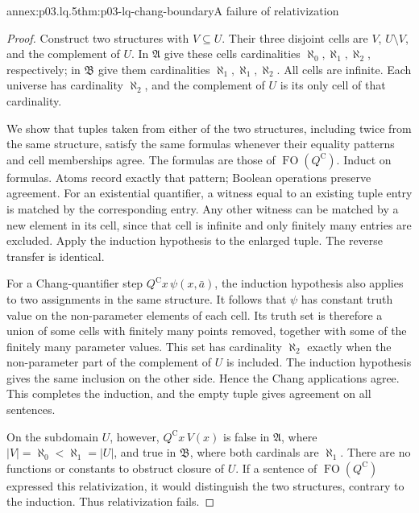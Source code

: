 \begin{annexitem}{annex:p03.lq.5}{thm:p03-lq-chang-boundary}{A failure of relativization}
\begin{proof}
Construct two structures with \(V\subseteq U\). Their three disjoint
cells are \(V\), \(U\setminus V\), and the complement of \(U\).
In \(\mathfrak A\) give these cells cardinalities
\(\aleph_0,\aleph_1,\aleph_2\), respectively; in \(\mathfrak B\)
give them cardinalities \(\aleph_1,\aleph_1,\aleph_2\).
All cells are infinite. Each universe has cardinality \(\aleph_2\),
and the complement of \(U\) is its only cell of that cardinality.

We show that tuples taken from either of the two structures, including
twice from the same structure, satisfy the same formulas whenever their
equality patterns and cell memberships agree. The formulas are those of
\(\operatorname{FO}(Q^{\mathrm C})\). Induct on formulas. Atoms
record exactly that pattern; Boolean operations preserve agreement.
For an existential quantifier, a witness equal to an existing tuple
entry is matched by the corresponding entry. Any other witness can
be matched by a new element in its cell, since that cell is infinite
and only finitely many entries are excluded. Apply the induction
hypothesis to the enlarged tuple. The reverse transfer is identical.

For a Chang-quantifier step \(Q^{\mathrm C}x\,\psi(x,\bar a)\),
the induction hypothesis also applies to two assignments in the
same structure. It follows that \(\psi\) has constant truth value
on the non-parameter elements of each cell. Its truth set is
therefore a union of some cells with finitely many points removed,
together with some of the finitely many parameter values. This
set has cardinality \(\aleph_2\) exactly when the non-parameter
part of the complement of \(U\) is included. The induction
hypothesis gives the same inclusion on the other side. Hence the
Chang applications agree. This completes the induction, and the
empty tuple gives agreement on all sentences.

On the subdomain \(U\), however, \(Q^{\mathrm C}x\,V(x)\)
is false in \(\mathfrak A\), where \(|V|=\aleph_0<\aleph_1=|U|\),
and true in \(\mathfrak B\), where both cardinals are \(\aleph_1\).
There are no functions or constants to obstruct closure of \(U\).
If a sentence of \(\operatorname{FO}(Q^{\mathrm C})\) expressed
this relativization, it would distinguish the two structures,
contrary to the induction. Thus relativization fails.
\end{proof}
\end{annexitem}


